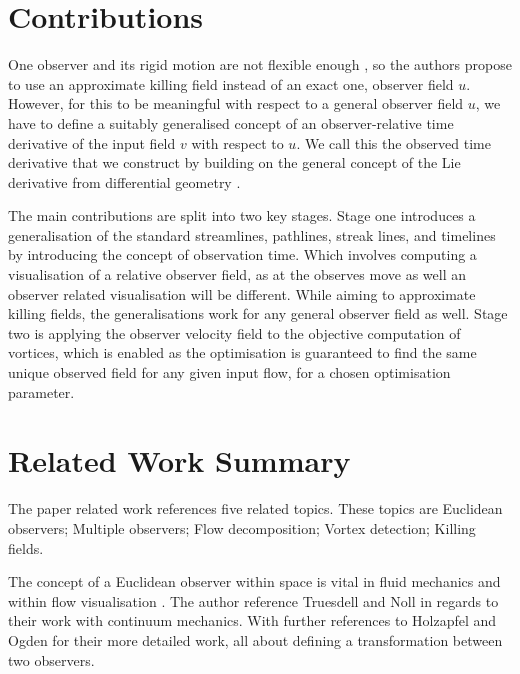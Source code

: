 \documentclass[a4paper,9pt]{article}
\begin{document}
\section{Contributions}

One observer and its rigid motion are not flexible enough \cite{17, 19}, so the authors propose to use an approximate killing field instead of an exact one, observer field $u$. However, for this to be meaningful with respect to a general observer field $u$, we have to define a suitably generalised concept of an observer-relative time derivative of the input field $v$ with respect to $u$. We call this the observed time derivative that we construct by building on the general concept of the Lie derivative from differential geometry \cite{16, 29, 32}.

The main contributions are split into two key stages. Stage one introduces a generalisation of the standard streamlines, pathlines, streak lines, and timelines by introducing the concept of observation time. Which involves computing a visualisation of a relative observer field, as at the observes move as well an observer related visualisation will be different. While aiming to approximate killing fields, the generalisations work for any general observer field as well. Stage two is applying the observer velocity field to the objective computation of vortices, which is enabled as the optimisation is guaranteed to find the same unique observed field for any given input flow, for a chosen optimisation parameter.

\section{Related Work Summary}

The paper related work references five related topics. These topics are Euclidean observers; Multiple observers; Flow decomposition; Vortex detection; Killing fields.

The concept of a Euclidean observer within space is vital in fluid mechanics \cite{20} and within flow visualisation \cite{17}. The author reference Truesdell and Noll \cite{46} in regards to their work with continuum mechanics. With further references to Holzapfel and Ogden \cite{22, 35} for their more detailed work, all about defining a transformation between two observers.
\end{document}
